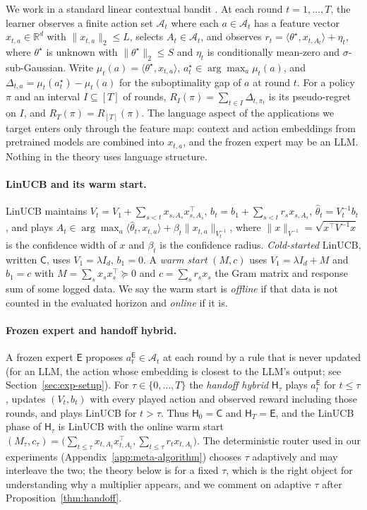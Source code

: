 \documentclass{article}
\theoremstyle{definition}
\theoremstyle{remark}
\theoremstyle{remark}
\newcommand{\Cold}{\mathsf{C}}
\newcommand{\Exp}{\mathsf{E}}
\newcommand{\Hyb}{\mathsf{H}}
\begin{document}
We work in a standard linear contextual bandit
\cite{abbasi2011improved,chu2011contextual,lattimore2020bandit}. At each round
$t=1,\dots,T$, the learner observes a finite action set $\mathcal A_t$ where
each $a\in\mathcal A_t$ has a feature vector $x_{t,a}\in\mathbb R^d$ with
$\|x_{t,a}\|_2\le L$, selects $A_t\in\mathcal A_t$, and observes
$r_t=\langle\theta^\star,x_{t,A_t}\rangle+\eta_t$, where $\theta^\star$ is
unknown with $\|\theta^\star\|_2\le S$ and $\eta_t$ is conditionally mean-zero
and $\sigma$-sub-Gaussian. Write $\mu_t(a)=\langle\theta^\star,x_{t,a}\rangle$,
$a_t^\star\in\arg\max_a\mu_t(a)$, and $\Delta_{t,a}=\mu_t(a_t^\star)-\mu_t(a)$
for the suboptimality gap of $a$ at round $t$. For a policy $\pi$ and an
interval $I\subseteq[T]$ of rounds, $R_I(\pi)=\sum_{t\in I}\Delta_{t,\pi_t}$ is
its pseudo-regret on $I$, and $R_T(\pi)=R_{[T]}(\pi)$. The language aspect of
the applications we target enters only through the feature map: context and
action embeddings from pretrained models are combined into $x_{t,a}$, and the
frozen expert may be an LLM. Nothing in the theory uses language structure.

\paragraph{LinUCB and its warm start.}
LinUCB maintains $V_t=V_1+\sum_{s<t}x_{s,A_s}x_{s,A_s}^\top$,
$b_t=b_1+\sum_{s<t}r_sx_{s,A_s}$, $\widehat\theta_t=V_t^{-1}b_t$, and plays
$A_t\in\arg\max_a\langle\widehat\theta_t,x_{t,a}\rangle+\beta_t\|x_{t,a}\|_{V_t^{-1}}$,
where $\|x\|_{V^{-1}}=\sqrt{x^\top V^{-1}x}$ is the confidence width of $x$ and
$\beta_t$ is the confidence radius. \emph{Cold-started} LinUCB, written
$\Cold$, uses $V_1=\lambda I_d$, $b_1=0$. A \emph{warm start} $(M,c)$ uses
$V_1=\lambda I_d+M$ and $b_1=c$ with $M=\sum_sx_sx_s^\top\succeq0$ and
$c=\sum_sr_sx_s$ the Gram matrix and response sum of some logged data. We say
the warm start is \emph{offline} if that data is not counted in the evaluated
horizon and \emph{online} if it is.

\paragraph{Frozen expert and handoff hybrid.}
A frozen expert $\Exp$ proposes $a_t^{\Exp}\in\mathcal A_t$ at each round by a
rule that is never updated (for an LLM, the action whose embedding is closest
to the LLM's output; see Section~\ref{sec:exp-setup}). For $\tau\in\{0,\dots,T\}$
the \emph{handoff hybrid} $\Hyb_\tau$ plays $a_t^{\Exp}$ for $t\le\tau$, updates
$(V_t,b_t)$ with every played action and observed reward including those
rounds, and plays LinUCB for $t>\tau$. Thus $\Hyb_0=\Cold$ and $\Hyb_T=\Exp$,
and the LinUCB phase of $\Hyb_\tau$ is LinUCB with the online warm start
$(M_\tau,c_\tau)=\bigl(\sum_{t\le\tau}x_{t,A_t}x_{t,A_t}^\top,\sum_{t\le\tau}r_tx_{t,A_t}\bigr)$.
The deterministic router used in our experiments
(Appendix~\ref{app:meta-algorithm}) chooses $\tau$ adaptively and may
interleave the two; the theory below is for a fixed $\tau$, which is the
right object for understanding why a multiplier appears, and we comment on
adaptive $\tau$ after Proposition~\ref{thm:handoff}.
\end{document}

